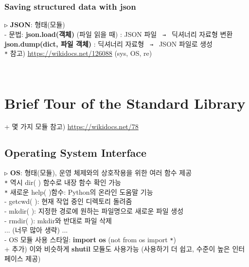 \documentclass[11pt,a4paper]{article}
\begin{document}
\subsubsection{\Large\textbf{Saving structured data with json}}
\begin{spacing}{1.5}
\texttt{▷} \textbf{JSON}: 형태(모듈)\\
- 문법: \textbf{json.load(객체)} (파일 읽을 때) : JSON 파일 \texttt{ → } 딕셔너리 자료형{ } 변환\\
\hspace*{2em} \textbf{json.dump(dict, 파일 객체)} : 딕셔너리 자료형 \texttt{ → } JSON 파일로 생성\\

\texttt{*} 참고) \url{https://wikidocs.net/126088} (sys, OS, re)
\end{spacing}\\


\section{\LARGE\textbf{Brief Tour of the Standard Library}}
+ 몇 가지 모듈 참고) \url{https://wikidocs.net/78}
\subsection{\Large\textbf{Operating System Interface}}
\begin{spacing}{1.5}
\texttt{▷} \textbf{OS}: 형태(모듈), 운영 체제와의 상호작용을 위한 여러 함수 제공\\
\hspace*{4em}\texttt{*} 역시 dir( ) 함수로 내장 함수 확인 가능\\
\hspace*{4em}\texttt{*} 새로운 help( )함수: Python의 온라인 도움말 기능\\

- getcwd( ): 현재 작업 중인 디렉토리 돌려줌\\
- mkdir( ): 지정한 경로에 원하는 파일명으로 새로운 파일 생성\\
- rmdir( ): mkdir와 반대로 파일 삭제\\

... (너무 많아 생략) ...\\

- OS 모듈 사용 스타일: \textbf{import os} (not from os import \texttt{*})\\

+ 추가) 이와 비슷하게 \textbf{shutil} 모듈도 사용가능 (사용하기 더 쉽고, 수준이 높은 인터페이스 제공)\\
\end{spacing}
\end{document}
